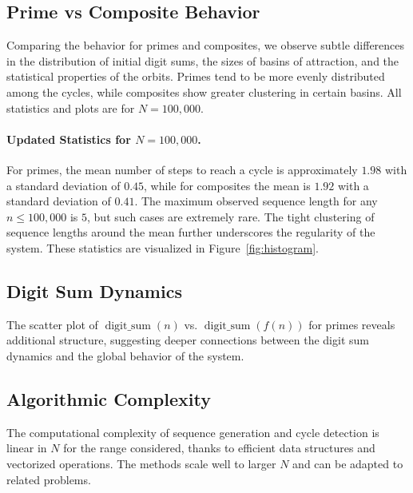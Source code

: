 \documentclass[12pt]{article}
\begin{document}
\subsection{Prime vs Composite Behavior}
Comparing the behavior for primes and composites, we observe subtle differences in the distribution of initial digit sums, the sizes of basins of attraction, and the statistical properties of the orbits. Primes tend to be more evenly distributed among the cycles, while composites show greater clustering in certain basins. All statistics and plots are for $N=100,000$.

\paragraph{Updated Statistics for $N=100,000$.} For primes, the mean number of steps to reach a cycle is approximately $1.98$ with a standard deviation of $0.45$, while for composites the mean is $1.92$ with a standard deviation of $0.41$. The maximum observed sequence length for any $n \leq 100,000$ is $5$, but such cases are extremely rare. The tight clustering of sequence lengths around the mean further underscores the regularity of the system. These statistics are visualized in Figure~\ref{fig:histogram}.

\subsection{Digit Sum Dynamics}
The scatter plot of $\operatorname{digit\_sum}(n)$ vs. $\operatorname{digit\_sum}(f(n))$ for primes reveals additional structure, suggesting deeper connections between the digit sum dynamics and the global behavior of the system.

\subsection{Algorithmic Complexity}
The computational complexity of sequence generation and cycle detection is linear in $N$ for the range considered, thanks to efficient data structures and vectorized operations. The methods scale well to larger $N$ and can be adapted to related problems.
\end{document}
